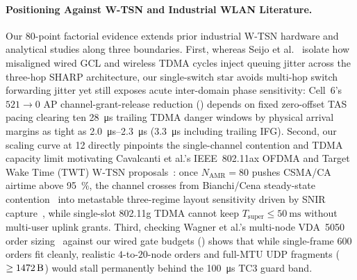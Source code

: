 \documentclass[11pt,a4paper]{article}
\newcommand{\Namr}{\ensuremath{N_{\mathrm{AMR}}}}
\newcommand{\Tsuper}{\ensuremath{T_{\mathrm{super}}}}
\begin{document}
\paragraph{Positioning Against W-TSN and Industrial WLAN Literature.}
Our $80$-point factorial evidence extends prior industrial W-TSN hardware and analytical studies along three boundaries. First, whereas Seijo et al.~\cite{seijo2022sharp} isolate how misaligned wired GCL and wireless TDMA cycles inject queuing jitter across the three-hop SHARP architecture, our single-switch star avoids multi-hop switch forwarding jitter yet still exposes acute inter-domain phase sensitivity: Cell~6's $521 \to 0$ AP channel-grant-release reduction () depends on fixed zero-offset TAS pacing clearing ten \qty{28}{\micro\second} trailing TDMA danger windows by physical arrival margins as tight as \qtyrange{2.0}{2.3}{\micro\second} (\qty{3.3}{\micro\second} including trailing IFG). Second, our scaling curve at \qty{12}{\mbps} directly pinpoints the single-channel contention and TDMA capacity limit motivating Cavalcanti et al.'s IEEE~802.11ax OFDMA and Target Wake Time (TWT) W-TSN proposals~\cite{cavalcanti2019extending}: once $\Namr=80$ pushes CSMA/CA airtime above \qty{95}{\percent}, the channel crosses from Bianchi/Cena steady-state contention~\cite{bianchi2000performance, cena2007evaluation} into metastable three-regime layout sensitivity driven by SNIR capture~\cite{lee2007experimental}, while single-slot 802.11g TDMA cannot keep $\Tsuper \le \qty{50}{\milli\second}$ without multi-user uplink grants. Third, checking Wagner et al.'s multi-node VDA~5050 order sizing~\cite{11511549} against our wired gate budgets () shows that while single-frame \qty{600}{\byte} orders fit cleanly, realistic $4$-to-$20$-node orders and full-MTU UDP fragments ($\ge \qty{1472}{\byte}$) would stall permanently behind the \qty{100}{\micro\second} TC3 guard band.
\end{document}

